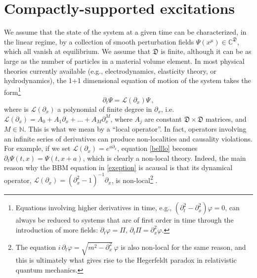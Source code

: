 \documentclass[prl, amsfonts, amssymb, amsmath, nofootinbib,reprint, showkeys, twoside,notitlepage]{revtex4-2}
\theoremstyle{definition}
\theoremstyle{theorem}
\theoremstyle{corollary}
\begin{document}
\section{Compactly-supported excitations} We assume that the state of the system at a given time can be characterized, in the linear regime, by a collection of smooth perturbation fields $\Psi(x^\mu)\in \mathbb{C}^{\mathfrak{D}}$, which all vanish at equilibrium.
We assume that $\mathfrak{D}$ is finite, although it can be as large as the number of particles in a material volume element. In most physical theories currently available (e.g., electrodynamics, elasticity theory, or hydrodynamics), the 1+1 dimensional equation of motion of the system takes the form\footnote{Equations involving higher derivatives in time, e.g., $(\partial_t^2{-}\partial^2_x)\varphi{=}0$, can always be reduced to systems that are of first order in time through the introduction of more fields: $\partial_t \varphi = \Pi$, $\partial_t \Pi = \partial^2_x \varphi$.} 
\begin{equation}\label{belllo}
\partial_t \Psi = \mathcal{L}(\partial_x) \Psi \, ,
\end{equation}
where is $\mathcal{L}(\partial_x)$ a polynomial of finite degree in $\partial_x$, i.e. $\mathcal{L}(\partial_x)=A_0 +A_1 \partial_x+...+A_M \partial_x^M$, where $A_j$ are constant $\mathfrak{D}\times \mathfrak{D}$ matrices, and $M \in \mathbb{N}$. This is what we mean by a ``local operator''. In fact, operators involving an infinite series of derivatives can produce non-localities and causality violations. For example, if we set $\mathcal{L}(\partial_x)=e^{a\partial_x}$, equation \eqref{belllo} becomes $\partial_t \Psi(t,x)=\Psi(t,x{+}a)$, which is clearly a non-local theory. Indeed, the main reason why the BBM equation in \eqref{exeption} is acausal is that its dynamical operator, $\mathcal{L}(\partial_x)=(\partial_x^2-1)^{-1}\partial_x$, is non-local\footnote{The equation $i \, \partial_t \varphi= \sqrt{m^2-\partial^2_x}\, \varphi$ is also non-local for the same reason, and this is ultimately what gives rise to the Hegerfeldt paradox in relativistic quantum mechanics.} \cite{Congy2020}.
\end{document}
